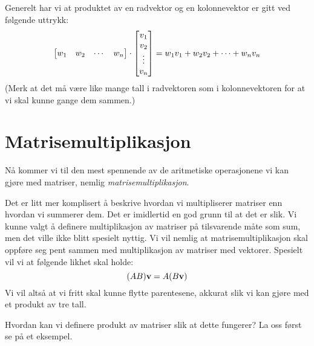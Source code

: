 Generelt har vi at produktet av en radvektor og en kolonnevektor er
gitt ved følgende uttrykk:
\[
\begin{bmatrix} w_1 & w_2 & \cdots & w_n \end{bmatrix}
\cdot \begin{bmatrix} v_1 \\ v_2 \\ \vdots \\ v_n \end{bmatrix}
= w_1 v_1 + w_2 v_2 + \cdots + w_n v_n
\]
(Merk at det må være like mange tall i radvektoren som i
kolonnevektoren for at vi skal kunne gange dem sammen.)


\section*{Matrisemultiplikasjon}

Nå kommer vi til den mest spennende av de aritmetiske operasjonene vi
kan gjøre med matriser, nemlig \emph{matrisemultiplikasjon}.

Det er litt mer komplisert å beskrive hvordan vi multipliserer
matriser enn hvordan vi summerer dem.  Det er imidlertid en god grunn
til at det er slik.  Vi kunne valgt å definere multiplikasjon av
matriser på tilsvarende måte som sum, men det ville ikke blitt
spesielt nyttig.  Vi vil nemlig at matrisemultiplikasjon skal oppføre
seg pent sammen med multiplikasjon av matriser med vektorer.  Spesielt
vil vi at følgende likhet skal holde:
\[
(AB) \mathbf{v} = A (B \mathbf{v})
\]
Vi vil altså at vi fritt skal kunne flytte parentesene, akkurat slik
vi kan gjøre med et produkt av tre tall.

Hvordan kan vi definere produkt av matriser slik at dette fungerer?
La oss først se på et eksempel.

